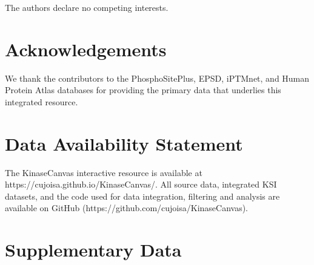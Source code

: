\documentclass[
  number,
  preprint,
  onecolumn]{elsarticle}
\begin{document}
The authors declare no competing interests.

\section{Acknowledgements}\label{acknowledgements}

We thank the contributors to the PhosphoSitePlus, EPSD, iPTMnet, and
Human Protein Atlas databases for providing the primary data that
underlies this integrated resource.

\section{Data Availability Statement}\label{data-availability-statement}

The KinaseCanvas interactive resource is available at
https://cujoisa.github.io/KinaseCanvas/. All source data, integrated KSI
datasets, and the code used for data integration, filtering and analysis
are available on GitHub (https://github.com/cujoisa/KinaseCanvas).

\section{Supplementary Data}\label{supplementary-data}

\begin{supptable}


\caption{\label{stab-1}}

\end{supptable}%

\begin{supptable}


\caption{\label{stab-2}}

\end{supptable}%

\begin{supptable}


\caption{\label{stab-3}}

\end{supptable}%
\end{document}
